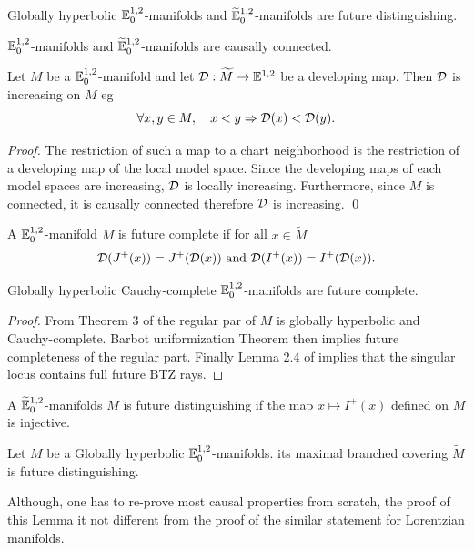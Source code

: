 \begin{lem} Globally hyperbolic  $\mathbb{E}^{1,2}_0$-manifolds and ${\widetilde {\mathbb{E}}}^{1,2}_0$-manifolds are future distinguishing.
\end{lem}


\begin{lem} $\mathbb{E}^{1,2}_0$-manifolds and ${\widetilde {\mathbb{E}}}^{1,2}_0$-manifolds are causally connected.
\end{lem}



\begin{lem}\label{lem:increasing_map} Let $M$ be a  $\mathbb{E}^{1,2}_0$-manifold and let $\mathcal{D}:\widetilde M\rightarrow {\mathbb E}^{1,2}_{}$ be a developing map.
Then $\mathcal{D}$ is  increasing on $M$ eg
$$\forall x,y\in M, \quad x<y \Rightarrow \mathcal{D}(x)<\mathcal{D}(y).$$
\end{lem}
\begin{proof} 
 The restriction of such a map to a chart neighborhood is the restriction of a developing map of the local model space. Since the developing maps of each model spaces are  increasing, $\mathcal{D}$ is locally increasing. Furthermore, since $M$ is connected, it is causally connected therefore $\mathcal{D}$ is increasing.
\qed\end{proof}


\begin{defi}
 A $\mathbb{E}^{1,2}_0$-manifold $M$ is future complete if for all $x\in \widetilde M$ 
 $$ \mathcal{D}(J^+(x)) = J^+(\mathcal{D}(x)) \text{ and }  \mathcal{D}(I^+(x)) = I^+(\mathcal{D}(x)).$$
\end{defi}

\begin{prop} Globally hyperbolic Cauchy-complete $\mathbb{E}^{1,2}_0$-manifolds are future complete.
\end{prop}
\begin{proof}
From Theorem 3 of \cite{brunswic2021cauchy} the regular par of $M$ is globally hyperbolic and Cauchy-complete. Barbot uniformization Theorem  \cite{barbot_globally_2004} then implies future completeness of the regular part. 
Finally Lemma 2.4 of \cite{brunswic2021cauchy} implies that the singular locus contains full future BTZ rays.
\end{proof}


\begin{defi} A ${\widetilde {\mathbb{E}}}^{1,2}_0$-manifolds $M$ is future distinguishing if the map $x\mapsto I^+(x)$ defined on $M$ is injective.
\end{defi}

\begin{lem} Let $M$ be a Globally hyperbolic $\mathbb{E}^{1,2}_0$-manifolds. its maximal branched covering $\widetilde M$ is future distinguishing.
\end{lem}
Although, one has to re-prove most causal properties from scratch, the proof of this Lemma it not different from the proof of the similar statement for Lorentzian manifolds. 

